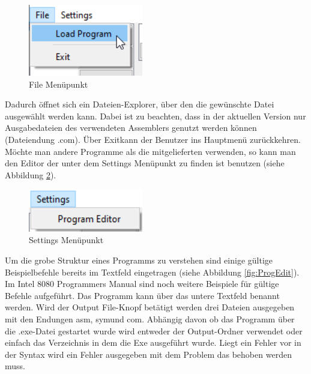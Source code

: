 \documentclass[12pt]{article}
\newcommand{\imgSpaceBefore}{\vspace{10pt}}
\begin{document}
\begin{figure}[H]
\centering
\includegraphics[width=5cm]{bilder/LoadFile}
\caption{File Menüpunkt}
\label{fig:LoadFile}
\end{figure}

\noindent
Dadurch öffnet sich ein Dateien-Explorer, über den die gewünschte Datei ausgewählt werden kann. Dabei ist zu beachten, dass in der aktuellen Version nur Ausgabedateien des verwendeten Assemblers genutzt werden können (Dateiendung \glqq .com\grqq). Über \glqq Exit\grqq kann der Benutzer ins Hauptmenü zurückkehren. Möchte man andere Programme als die mitgelieferten verwenden, so kann man den Editor der unter dem Settings Menüpunkt zu finden ist benutzen (siehe Abbildung \ref{fig:Settings}).\imgSpaceBefore

\begin{figure}[H]
\centering
\includegraphics[width=5cm]{bilder/Settings}
\caption{Settings Menüpunkt}
\label{fig:Settings}
\end{figure}

\noindent
Um die grobe Struktur eines Programms zu verstehen sind einige gültige Beispielbefehle bereits im Textfeld eingetragen (siehe Abbildung \ref{fig:ProgEdit}). Im Intel 8080 Programmers Manual sind noch weitere Beispiele für gültige Befehle aufgeführt. Das Programm kann über das untere Textfeld benannt werden. Wird der \glqq Output File\grqq-Knopf betätigt werden drei Dateien ausgegeben mit den Endungen \glqq asm\grqq, \glqq sym\grqq und \glqq com\grqq. Abhängig davon ob das Programm über die .exe-Datei gestartet wurde wird entweder der \glqq Output\grqq-Ordner verwendet oder einfach das Verzeichnis in dem die Exe ausgeführt wurde. Liegt ein Fehler vor in der Syntax wird ein Fehler ausgegeben mit dem Problem das behoben werden muss.\imgSpaceBefore
\end{document}
